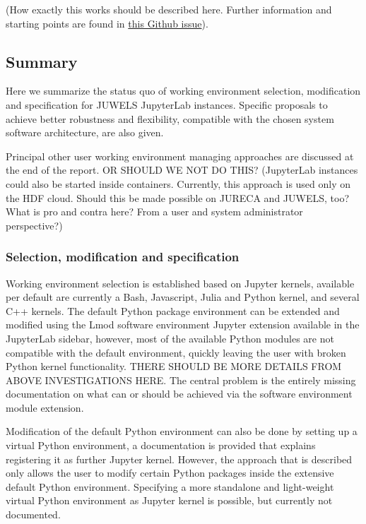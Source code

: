 \documentclass[11pt,a4paper]{article}
\begin{document}
(How exactly this works should be described here. Further information and starting points are found in \href{https://github.com/ExaESM-WP4/JupyterHub-Evaluation-Whitepaper/issues/6}{this Github issue}).

\subsection{Summary}
\label{sect:working-envs:summary}

Here we summarize the status quo of working environment selection, modification and specification for JUWELS JupyterLab instances.
Specific proposals to achieve better robustness and flexibility, compatible with the chosen system software architecture, are also given.

Principal other user working environment managing approaches are discussed at the end of the report. OR SHOULD WE NOT DO THIS? (JupyterLab instances could also be started inside containers. Currently, this approach is used only on the HDF cloud. Should this be made possible on JURECA and JUWELS, too? What is pro and contra here? From a user and system administrator perspective?)

\subsubsection{Selection, modification and specification}

Working environment selection is established based on Jupyter kernels, available per default are currently a Bash, Javascript, Julia and Python kernel, and several C++ kernels.
The default Python package environment can be extended and modified using the Lmod software environment Jupyter extension available in the JupyterLab sidebar, however, most of the available Python modules are not compatible with the default environment, quickly leaving the user with broken Python kernel functionality.
THERE SHOULD BE MORE DETAILS FROM ABOVE INVESTIGATIONS HERE.
The central problem is the entirely missing documentation on what can or should be achieved via the software environment module extension.

Modification of the default Python environment can also be done by setting up a virtual Python environment, a documentation is provided that explains registering it as further Jupyter kernel.
However, the approach that is described only allows the user to modify certain Python packages inside the extensive default Python environment.
Specifying a more standalone and light-weight virtual Python environment as Jupyter kernel is possible, but currently not documented.
\end{document}
